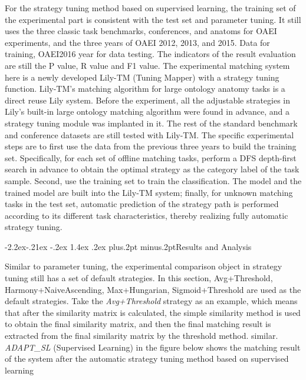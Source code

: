 \documentclass[twoside]{article}
\makeatletter
\def\subsubsection{\@startsection{subsubsection}{3}{\z@}%
 {-2.2ex\@plus -.21ex \@minus -.2ex}%
 {1.4ex \@plus.2ex}
{\normalfont\normalsize\protect\baselineskip=12pt plus.2pt minus.2pt\sl}}
\makeatother
\begin{document}
\begin{multicols}{2}
For the strategy tuning method based on supervised learning, the training set of the experimental part is consistent with the test set and parameter tuning. It still uses the three classic task benchmarks, conferences, and anatoms for OAEI experiments, and the three years of OAEI 2012, 2013, and 2015. Data for training, OAEI2016 year for data testing. 
The indicators of the result evaluation are still the P value, R value and F1 value. 
The experimental matching system here is a newly developed Lily-TM (Tuning Mapper) with a strategy tuning function. 
Lily-TM's matching algorithm for large ontology anatomy tasks is a direct reuse Lily system. Before the experiment, all the adjustable strategies in Lily's built-in large ontology matching algorithm were found in advance, and a strategy tuning module was implanted in it.
The rest of the standard benchmark and conference datasets are still tested with Lily-TM. 
The specific experimental steps are to first use the data from the previous three years to build the training set. Specifically, for each set of offline matching tasks, perform a DFS depth-first search in advance to obtain the optimal strategy as the category label of the task sample. Second, use the training set to train the classification. The model and the trained model are built into the Lily-TM system; finally, for unknown matching tasks in the test set, automatic prediction of the strategy path is performed according to its different task characteristics, thereby realizing fully automatic strategy tuning.

\subsubsection{Results and Analysis}

Similar to parameter tuning, the experimental comparison object in strategy tuning still has a set of default strategies. In this section, Avg+Threshold, Harmony+NaiveAscending, Max+Hungarian, Sigmoid+Threshold are used as the default strategies. 
Take the {\it Avg+Threshold} strategy as an example, which means that after the similarity matrix is calculated, the simple similarity method is used to obtain the final similarity matrix, and then the final matching result is extracted from the final similarity matrix by the threshold method. similar. 
{\it ADAPT\_SL} (Supervised Learning) in the figure below shows the matching result of the system after the automatic strategy tuning method based on supervised learning


\end{multicols}
\end{document}
